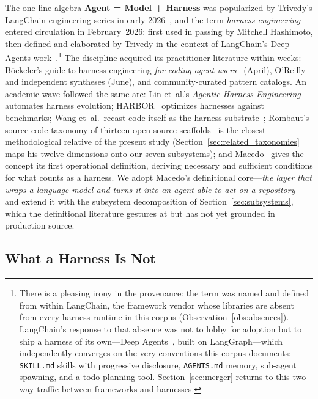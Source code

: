 \documentclass[11pt,a4paper]{article}
\begin{document}
The one-line algebra \textbf{Agent = Model + Harness} was popularized by Trivedy's LangChain engineering series in early 2026~\cite{trivedy2026anatomy}, and the term \emph{harness engineering} entered circulation in February~2026: first used in passing by Mitchell Hashimoto, then defined and elaborated by Trivedy in the context of LangChain's Deep Agents work~\cite{deepfeed2026}.\footnote{There is a pleasing irony in the provenance: the term was named and defined from within LangChain, the framework vendor whose libraries are absent from every harness runtime in this corpus (Observation~\ref{obs:absences}). LangChain's response to that absence was not to lobby for adoption but to ship a harness of its own---Deep Agents~\cite{deepagents2026}, built on LangGraph---which independently converges on the very conventions this corpus documents: \texttt{SKILL.md} skills with progressive disclosure, \texttt{AGENTS.md} memory, sub-agent spawning, and a todo-planning tool. Section~\ref{sec:merger} returns to this two-way traffic between frameworks and harnesses.}
The discipline acquired its practitioner literature within weeks: B{\"o}ckeler's guide to harness engineering \emph{for coding-agent users}~\cite{bockeler2026} (April), O'Reilly and independent syntheses (June), and community-curated pattern catalogs.
An academic wave followed the same arc: Lin et~al.'s \emph{Agentic Harness Engineering}~\cite{lin2026ahe} automates harness evolution; HARBOR~\cite{harbor2026} optimizes harnesses against benchmarks; Wang et~al.\ recast code itself as the harness substrate~\cite{codeharness2026}; Rombaut's source-code taxonomy of thirteen open-source scaffolds~\cite{rombaut2026} is the closest methodological relative of the present study (Section~\ref{sec:related_taxonomies} maps his twelve dimensions onto our seven subsystems); and Macedo~\cite{macedo2026} gives the concept its first operational definition, deriving necessary and sufficient conditions for what counts as a harness.
We adopt Macedo's definitional core---\emph{the layer that wraps a language model and turns it into an agent able to act on a repository}---and extend it with the subsystem decomposition of Section~\ref{sec:subsystems}, which the definitional literature gestures at but has not yet grounded in production source.

\subsection{What a Harness Is Not}
\label{sec:terminology}
\end{document}
